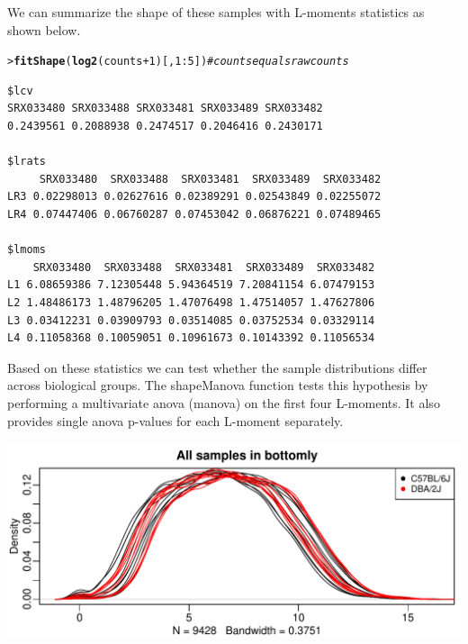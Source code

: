 \documentclass[a4paper, 10pt]{article}\usepackage[]{graphicx}\usepackage[]{color}
\makeatletter
\def\maxwidth{ %
  \ifdim\Gin@nat@width>\linewidth
    \linewidth
  \else
    \Gin@nat@width
  \fi
}
\newcommand{\hlnum}[1]{\textcolor[rgb]{0.686,0.059,0.569}{#1}}%
\newcommand{\hlcom}[1]{\textcolor[rgb]{0.678,0.584,0.686}{\textit{#1}}}%
\newcommand{\hlopt}[1]{\textcolor[rgb]{0,0,0}{#1}}%
\newcommand{\hlstd}[1]{\textcolor[rgb]{0.345,0.345,0.345}{#1}}%
\newcommand{\hlkwd}[1]{\textcolor[rgb]{0.737,0.353,0.396}{\textbf{#1}}}%
\newenvironment{kframe}{%
 \def\at@end@of@kframe{}%
 \ifinner\ifhmode%
  \def\at@end@of@kframe{\end{minipage}}%
  \begin{minipage}{\columnwidth}%
 \fi\fi%
 \def\FrameCommand##1{\hskip\@totalleftmargin \hskip-\fboxsep
 \colorbox{shadecolor}{##1}\hskip-\fboxsep
     \hskip-\linewidth \hskip-\@totalleftmargin \hskip\columnwidth}%
 \MakeFramed {\advance\hsize-\width
   \@totalleftmargin\z@ \linewidth\hsize
   \@setminipage}}%
 {\par\unskip\endMakeFramed%
 \at@end@of@kframe}
\newenvironment{knitrout}{}{} %
\makeatother
\begin{document}
We can summarize the shape of these samples with L-moments statistics as
shown below.
\begin{knitrout}\small
{}\color{fgcolor}\begin{kframe}
\begin{alltt}
\hlstd{> }\hlkwd{fitShape}\hlstd{(}\hlkwd{log2}\hlstd{(counts}\hlopt{+}\hlnum{1}\hlstd{)[,}\hlnum{1}\hlopt{:}\hlnum{5}\hlstd{])} \hlcom{# counts equals raw counts}
\end{alltt}
\begin{verbatim}
$lcv
SRX033480 SRX033488 SRX033481 SRX033489 SRX033482 
0.2439561 0.2088938 0.2474517 0.2046416 0.2430171 

$lrats
     SRX033480  SRX033488  SRX033481  SRX033489  SRX033482
LR3 0.02298013 0.02627616 0.02389291 0.02543849 0.02255072
LR4 0.07447406 0.06760287 0.07453042 0.06876221 0.07489465

$lmoms
    SRX033480  SRX033488  SRX033481  SRX033489  SRX033482
L1 6.08659386 7.12305448 5.94364519 7.20841154 6.07479153
L2 1.48486173 1.48796205 1.47076498 1.47514057 1.47627806
L3 0.03412231 0.03909793 0.03514085 0.03752534 0.03329114
L4 0.11058368 0.10059051 0.10961673 0.10143392 0.11056534
\end{verbatim}
\end{kframe}
\end{knitrout}
\noindent Based on these statistics we can test whether the sample distributions
differ across biological groups. The shapeManova function tests this
hypothesis by performing a multivariate anova (manova) on the first four L-moments. 
It also provides single anova p-values for each L-moment separately.

\begin{knitrout}\small
{}\color{fgcolor}

{\centering \includegraphics[width=\maxwidth]{figure/shapeManova3-1} 

}



\end{knitrout}
\end{document}

